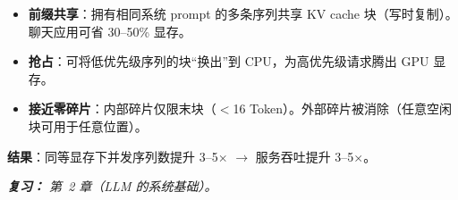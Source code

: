 \begin{questionbox}
\begin{itemize}
  \item \textbf{前缀共享}：拥有相同系统 prompt 的多条序列共享 KV cache 块（写时复制）。聊天应用可省 30--50\% 显存。
  \item \textbf{抢占}：可将低优先级序列的块“换出”到 CPU，为高优先级请求腾出 GPU 显存。
  \item \textbf{接近零碎片}：内部碎片仅限末块（$<$16 Token）。外部碎片被消除（任意空闲块可用于任意位置）。
\end{itemize}

\textbf{结果}：同等显存下并发序列数提升 3--5$\times$ $\rightarrow$ 服务吞吐提升 3--5$\times$。

\emph{\textbf{复习：} 第~2 章（LLM 的系统基础）。}
\end{questionbox}

